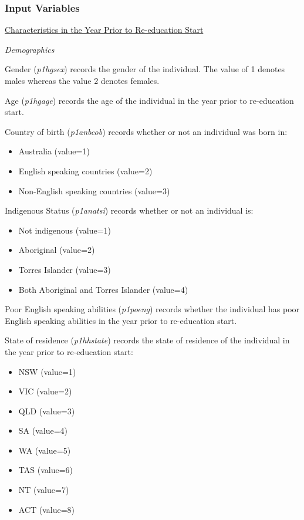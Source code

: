 \documentclass[12pt, a4paper]{article}
\begin{document}
\subsubsection{Input Variables}

\underline{Characteristics in the Year Prior to Re-education Start}

\emph{Demographics}

Gender (\textit{p1\textunderscore{}hgsex}) records the gender of the individual. The value of 1 denotes males whereas the value 2 denotes females. 

Age (\textit{p1\textunderscore{}hgage}) records the age of the individual in the year prior to re-education start.
 
Country of birth (\textit{p1\textunderscore{}anbcob}) records whether or not an individual was born in:
\begin{itemize}
  \item Australia (value=1) 
  \item English speaking countries (value=2)
  \item Non-English speaking countries (value=3)
\end{itemize}  

Indigenous Status (\textit{p1\textunderscore{}anatsi}) records whether or not an individual is:
\begin{itemize}
  \item Not indigenous (value=1)
  \item Aboriginal (value=2)
  \item Torres Islander (value=3)
  \item Both Aboriginal and Torres Islander (value=4) 
\end{itemize}  

Poor English speaking abilities (\textit{p1\textunderscore{}poeng}) records whether the individual has poor English speaking abilities in the year prior to re-education start. 

State of residence (\textit{p1\textunderscore{}hhstate}) records the state of residence of the individual in the year prior to re-education start:
\begin{itemize}
  \item NSW (value=1)
  \item VIC (value=2)
  \item QLD (value=3)
  \item SA (value=4)
  \item WA (value=5)
  \item TAS (value=6)
  \item NT (value=7)
  \item ACT (value=8) 
\end{itemize}  
\end{document}
